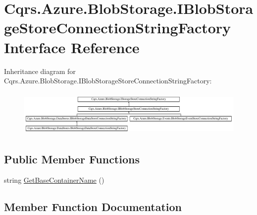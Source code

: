\hypertarget{interfaceCqrs_1_1Azure_1_1BlobStorage_1_1IBlobStorageStoreConnectionStringFactory}{}\section{Cqrs.\+Azure.\+Blob\+Storage.\+I\+Blob\+Storage\+Store\+Connection\+String\+Factory Interface Reference}
\label{interfaceCqrs_1_1Azure_1_1BlobStorage_1_1IBlobStorageStoreConnectionStringFactory}
Inheritance diagram for Cqrs.\+Azure.\+Blob\+Storage.\+I\+Blob\+Storage\+Store\+Connection\+String\+Factory\+:\begin{figure}[H]
\begin{center}
\leavevmode
\includegraphics[height=2.258065cm]{interfaceCqrs_1_1Azure_1_1BlobStorage_1_1IBlobStorageStoreConnectionStringFactory}
\end{center}
\end{figure}
\subsection*{Public Member Functions}
\begin{DoxyCompactItemize}
\item 
string \hyperlink{interfaceCqrs_1_1Azure_1_1BlobStorage_1_1IBlobStorageStoreConnectionStringFactory_a57145e68e3bda84bc610fa61226a850c}{Get\+Base\+Container\+Name} ()
\end{DoxyCompactItemize}


\subsection{Member Function Documentation}
\mbox{\label{interfaceCqrs_1_1Azure_1_1BlobStorage_1_1IBlobStorageStoreConnectionStringFactory_a57145e68e3bda84bc610fa61226a850c}} 
